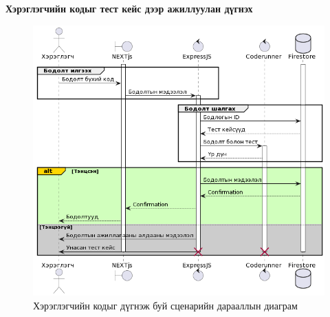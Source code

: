 \clearpage

\textbf{Хэрэглэгчийн кодыг тест кейс дээр ажиллуулан дүгнэх}
\begin{figure}[h]
  \centering
  \includegraphics[width=15cm]{img/diagrams/sequence.png}
  \caption{Хэрэглэгчийн кодыг дүгнэж буй сценарийн дарааллын диаграм}
\end{figure}
